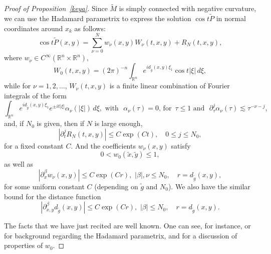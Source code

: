 \documentclass[10pt]{amsart}
\newcommand{\1}{{\bf 1}}
\begin{document}
\begin{proof}[Proof of Proposition~\ref{keya}]
Since  $\tilde M$ is simply connected with negative curvature, 
we can
use the Hadamard parametrix to express the solution $\cos t\tilde P$  in normal coordinates around $x_k$
  as follows:
\begin{equation}\label{ak13}
\cos t\tilde P( x,
 y)=
\sum_{\nu=0}^N
w_\nu(x, y)W_\nu(t, x, y)
+R_N(t, x, y),
\end{equation}
where $w_\nu \in C^\infty({\mathbb R}^{n}
\times {\mathbb R}^{n})$,
\begin{equation}\label{k14}
W_0(t, x, y)=(2\pi)^{-n}
\int_{{\mathbb R}^{n}} e^{id_{\tilde g}( x,
  y)\xi_1} \cos t|\xi| \, d\xi,
\end{equation}
while for $\nu=1,2,\dots$, $W_\nu(t, x, y)$
is a finite linear combination of Fourier integrals 
of the form
\begin{equation}\label{k15}
\int_{{\mathbb R}^{n}}
e^{id_{\tilde g}( x, y)\xi_1}
e^{\pm it|\xi|}
\alpha_\nu(|\xi|)\, d\xi,
\, \, \text{with } \, \,
\alpha_\nu(\tau)=0, \, \text{for } \, \tau\le 1
\, \, \text{and } \, \, \partial^j_\tau \alpha_\nu(\tau)
\lesssim \tau^{-\nu-j},
\end{equation}
and, if $N_0$ is given, then if $N$ is large enough,
\begin{equation}\label{k16}
|\partial_t^j R_N(t, x, y)|\le C\exp(Ct),
\quad
0\le j\le N_0,
\end{equation}
for a fixed constant $C$. 
And the coefficients 
$w_\nu( x, y)$ satisfy
\begin{equation}\label{k17}
0<w_0(\tilde x,\tilde y)\le 1,
\end{equation}
as well as
\begin{equation}\label{k19}
|\partial^\beta_x w_\nu( x, y)|
\le C\exp(Cr), \, \,
|\beta|, \nu\le N_0, \quad r=d_{\tilde g}( x,
 y),
\end{equation}
for some uniform constant $C$ (depending on 
$\tilde g$ and $N_0$). We also have the similar bound for the distance function
\begin{equation}\label{k19a}
|\partial^\beta_{x,y} d_{\tilde g}( x,
 y)|
\le C\exp(Cr), \, \,
|\beta|\le N_0, \quad r=d_{\tilde g}( x,
 y).
\end{equation}




The facts that we have just recited are well known.
One can see, for instance,  \cite{Berard} or \cite[\S 1.1, \S 3.6]{SoggeHangzhou} for 
background regarding the Hadamard parametrix,
and \cite{SoggeZelditchL4} for a discussion
of properties of $w_0$.



\end{proof}
\end{document}
